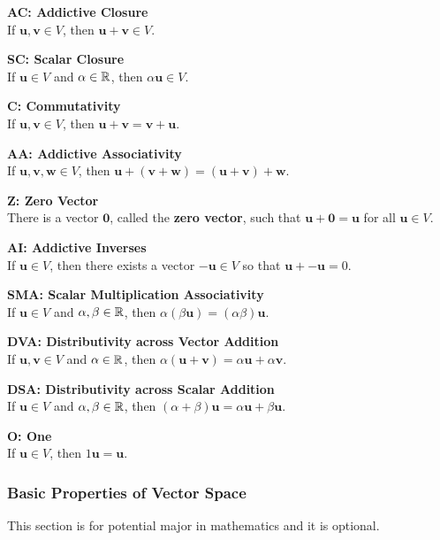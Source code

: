 \documentclass[a4paper,12pt]{article}
\begin{document}
\begin{pst}
  \begin{alist}
    \item \textbf{AC: Addictive Closure}\\
    If $\mathbf{u},\mathbf{v}\in V$, then $\mathbf{u}+\mathbf{v}\in V$.
    \item \textbf{SC: Scalar Closure}\\
    If $\mathbf{u}\in V$ and $\alpha\in\mathbb{R}$, then $\alpha\mathbf{u}\in V$.
    \item \textbf{C: Commutativity}\\
    If $\mathbf{u},\mathbf{v}\in V$, then $\mathbf{u}+\mathbf{v}=\mathbf{v}+\mathbf{u}$.
    \item \textbf{AA: Addictive Associativity}\\
    If $\mathbf{u},\mathbf{v},\mathbf{w}\in V$, then $\mathbf{u}+(\mathbf{v}+\mathbf{w})=(\mathbf{u}+\mathbf{v})+\mathbf{w}$.
    \item \textbf{Z: Zero Vector}\\
    There is a vector $\mathbf{0}$, called the \textbf{zero vector}, such that $\mathbf{u}+\mathbf{0}=\mathbf{u}$ for all $\mathbf{u}\in V$.
    \item \textbf{AI: Addictive Inverses}\\
    If $\mathbf{u}\in V$, then there exists a vector $-\mathbf{u}\in V$ so that $\mathbf{u}+\mathbf{-u}=0$.
    \item \textbf{SMA: Scalar Multiplication Associativity}\\
    If $\mathbf{u}\in V$ and $\alpha,\beta\in\mathbb{R}$, then $\alpha(\beta\mathbf{u})=(\alpha\beta)\mathbf{u}$.
    \item \textbf{DVA: Distributivity across Vector Addition}\\
    If $\mathbf{u},\mathbf{v}\in V$ and $\alpha\in\mathbb{R}$, then $\alpha(\mathbf{u}+\mathbf{v})=\alpha\mathbf{u}+\alpha\mathbf{v}$.
    \item \textbf{DSA: Distributivity across Scalar Addition}\\
    If $\mathbf{u}\in V$ and $\alpha,\beta\in\mathbb{R}$, then $(\alpha+\beta)\mathbf{u}=\alpha\mathbf{u}+\beta\mathbf{u}$.
    \item \textbf{O: One}\\
    If $\mathbf{u}\in V$, then $1\mathbf{u}=\mathbf{u}$.
  \end{alist}
\end{pst}

\subsubsection{Basic Properties of Vector Space}
\begin{cmt}
  This section is for potential major in mathematics and it is optional.
\end{cmt}\n
\end{document}
